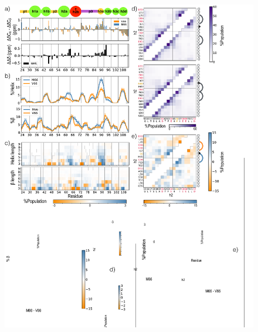 \documentclass[10pt,letterpaper]{article}
\begin{document}
\begin{figure}[!ht]
\includegraphics[scale=0.5,width=\textwidth,trim={0 0cm 0 0cm},clip]{./figures/fig3.pdf}

\end{figure}
\end{document}

